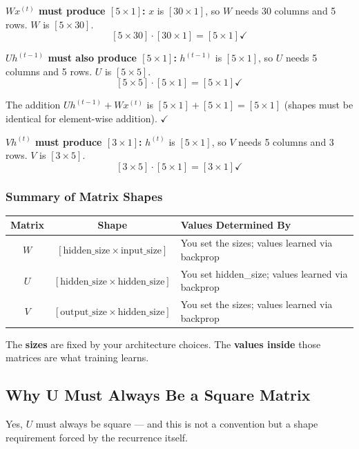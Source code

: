 \textbf{$W x^{(t)}$ must produce $[5 \times 1]$:}
$x$ is $[30 \times 1]$, so $W$ needs 30 columns and 5 rows. $W$ is $[5 \times 30]$.
\[
[5 \times 30] \cdot [30 \times 1] = [5 \times 1] \checkmark
\]

\textbf{$U h^{(t-1)}$ must also produce $[5 \times 1]$:}
$h^{(t-1)}$ is $[5 \times 1]$, so $U$ needs 5 columns and 5 rows. $U$ is $[5 \times 5]$.
\[
[5 \times 5] \cdot [5 \times 1] = [5 \times 1] \checkmark
\]

The addition $U h^{(t-1)} + W x^{(t)}$ is $[5 \times 1] + [5 \times 1] = [5 \times 1]$ (shapes must be identical for element-wise addition). $\checkmark$

\textbf{$V h^{(t)}$ must produce $[3 \times 1]$:}
$h^{(t)}$ is $[5 \times 1]$, so $V$ needs 5 columns and 3 rows. $V$ is $[3 \times 5]$.
\[
[3 \times 5] \cdot [5 \times 1] = [3 \times 1] \checkmark
\]

\subsubsection{Summary of Matrix Shapes}

\begin{center}
\begin{tabular}{|c|c|>{\raggedright\arraybackslash}p{5.2cm}|}
\hline
\textbf{Matrix} & \textbf{Shape} & \textbf{Values Determined By} \\
\hline
$W$ & $[\text{hidden\_size} \times \text{input\_size}]$ & You set the sizes; values learned via backprop \\
$U$ & $[\text{hidden\_size} \times \text{hidden\_size}]$ & You set hidden\_size; values learned via backprop \\
$V$ & $[\text{output\_size} \times \text{hidden\_size}]$ & You set the sizes; values learned via backprop \\
\hline
\end{tabular}
\end{center}

The \textbf{sizes} are fixed by your architecture choices. The \textbf{values inside} those matrices are what training learns.


\subsection{Why U Must Always Be a Square Matrix}

Yes, $U$ must always be square --- and this is not a convention but a shape requirement forced by the recurrence itself.

